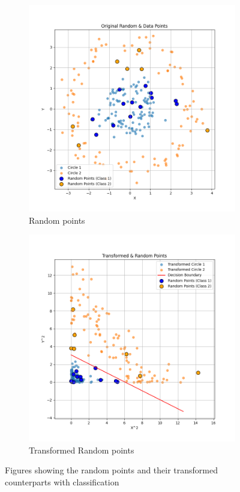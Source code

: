 \documentclass{article}
\begin{document}
\begin{figure}[H]
    \centering
    \begin{subfigure}{0.45\textwidth}
        \centering
        \includegraphics[width=\textwidth]{original_random_data_points.png}
        \caption{Random points}
    \end{subfigure}
    \hfill
    \begin{subfigure}{0.45\textwidth}
        \centering
        \includegraphics[width=\textwidth]{transformed_random_data_points.png}
        \caption{Transformed Random points}
    \end{subfigure}
    \caption{Figures showing the random points and their transformed counterparts with classification}
\end{figure}
\end{document}
